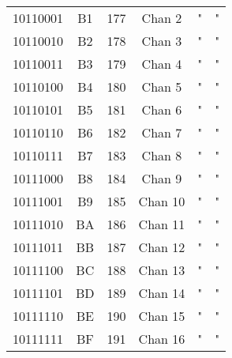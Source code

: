 \begin{center}
\begin{supertabular}{| c | c | c | c | c | c |}
                10110001 & B1 & 177 & Chan 2   &                   "                    &                    "                        \\
             10110010 & B2 & 178 & Chan 3   &                   "                    &                    "                        \\
                10110011 & B3 & 179 & Chan 4   &                   "                    &                    "                        \\
             10110100 & B4 & 180 & Chan 5   &                   "                    &                    "                        \\
                10110101 & B5 & 181 & Chan 6   &                   "                    &                    "                        \\
             10110110 & B6 & 182 & Chan 7   &                   "                    &                    "                        \\
                10110111 & B7 & 183 & Chan 8   &                   "                    &                    "                        \\
             10111000 & B8 & 184 & Chan 9   &                   "                    &                    "                        \\
                10111001 & B9 & 185 & Chan 10  &                   "                    &                    "                        \\
             10111010 & BA & 186 & Chan 11  &                   "                    &                    "                        \\
                10111011 & BB & 187 & Chan 12  &                   "                    &                    "                        \\
             10111100 & BC & 188 & Chan 13  &                   "                    &                    "                        \\
                10111101 & BD & 189 & Chan 14  &                   "                    &                    "                        \\
             10111110 & BE & 190 & Chan 15  &                   "                    &                    "                        \\
                10111111 & BF & 191 & Chan 16  &                   "                    &                    "                        \\
        \end{supertabular}
        \end{center}

